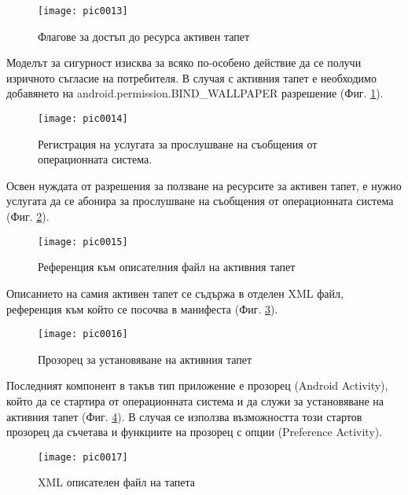 \begin{figure}[h]
  \centering
  \texttt{[image: pic0013]}
  \caption{Флагове за достъп до ресурса активен тапет}
\label{fig:pic0013}
\end{figure}
\FloatBarrier

Моделът за сигурност изисква за всяко по-особено действие да се получи изричното съгласие на потребителя. В случая с активния тапет е необходимо добавянето на android.permission.BIND\_WALLPAPER разрешение (Фиг. \ref{fig:pic0013}).

\begin{figure}[h]
  \centering
  \texttt{[image: pic0014]}
  \caption{Регистрация на услугата за прослушване на съобщения от операционната система.}
\label{fig:pic0014}
\end{figure}
\FloatBarrier

Освен нуждата от разрешения за ползване на ресурсите за активен тапет, е нужно услугата да се абонира за прослушване на съобщения от операционната система (Фиг. \ref{fig:pic0014}).

\begin{figure}[h]
  \centering
  \texttt{[image: pic0015]}
  \caption{Референция към описателния файл на активния тапет}
\label{fig:pic0015}
\end{figure}
\FloatBarrier

Описанието на самия активен тапет се съдържа в отделен XML файл, референция към който се посочва в манифеста (Фиг. \ref{fig:pic0015}).

\begin{figure}[h]
  \centering
  \texttt{[image: pic0016]}
  \caption{Прозорец за установяване на активния тапет}
\label{fig:pic0016}
\end{figure}
\FloatBarrier

Последният компонент в такъв тип приложение е прозорец (Android Activity), който да се стартира от операционната система и да служи за установяване на активния тапет (Фиг. \ref{fig:pic0016}). В случая се използва възможността този стартов прозорец да съчетава и функциите на прозорец с опции (Preference Activity).

\begin{figure}[h]
  \centering
  \texttt{[image: pic0017]}
  \caption{XML описателен файл на тапета}
\label{fig:pic0017}
\end{figure}
\FloatBarrier

